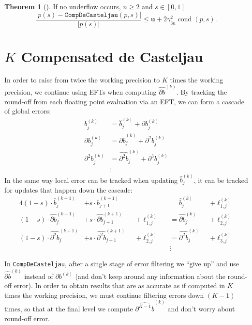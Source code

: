 \documentclass[letterpaper,10pt]{article}
\theoremstyle{definition}
\newtheorem{theorem}{Theorem}
\newcommand{\cond}[1]{\operatorname{cond}\left(#1\right)}
\newcommand{\mach}{\mathbf{u}}
\begin{document}
\begin{theorem}[\cite{Jiang2010}]
  If no underflow occurs, \(n \geq 2\) and \(s \in \left[0, 1\right]\)
  \begin{equation}
    \frac{\left|p(s) - \mathtt{CompDeCasteljau}(p, s)\right|}{\left|p(s)\right|} \leq \mach +
    2 \gamma_{3n}^2 \cond{p, s}.
  \end{equation}
\end{theorem}

\section{\texorpdfstring{\(K\)}{K} Compensated de Casteljau}\label{compensated-k}

In order to raise from twice the working precision to \(K\) times the
working precision, we continue using EFTs when computing
\(\widehat{\partial b}^{(k)}\). By tracking the round-off from each
floating point evaluation via an EFT, we can form a cascade of global errors:
\begin{align}
  b_j^{(k)} &= \widehat{b}_j^{(k)} + \partial b_j^{(k)} \\
  \partial b_j^{(k)} &= \widehat{\partial b}_j^{(k)} + \partial^2 b_j^{(k)} \\
  \partial^2 b_j^{(k)} &= \widehat{\partial^2 b}_j^{(k)} +
  \partial^3 b_j^{(k)} \\
  & \vdots \nonumber
\end{align}
In the same way local error can be tracked when updating
\(\widehat{b}_j^{(k)}\), it can be tracked for updates that happen down
the cascade:
\begin{alignat}{4}
  (1 - s) \cdot \widehat{b}_j^{(k + 1)} &+
  s \cdot \widehat{b}_{j + 1}^{(k + 1)} &&  &&=
  \widehat{b}_j^{(k)} &&+ \ell_{1, j}^{(k)} \\
  (1 - s) \cdot \widehat{\partial b}_j^{(k + 1)} &+
  s \cdot \widehat{\partial b}_{j + 1}^{(k + 1)} &&+ \ell_{1, j}^{(k)} &&=
  \widehat{\partial b}_j^{(k)} &&+ \ell_{2, j}^{(k)} \\
  (1 - s) \cdot \widehat{\partial^2 b}_j^{(k + 1)} &+
  s \cdot \widehat{\partial^2 b}_{j + 1}^{(k + 1)} &&+ \ell_{2, j}^{(k)} &&=
  \widehat{\partial^2 b}_j^{(k)} &&+ \ell_{3, j}^{(k)} \\
  &  &&  &&\vdots && \nonumber
\end{alignat}

In \texttt{CompDeCasteljau}, after a single stage of error filtering we
``give up'' and use \(\widehat{\partial b}^{(k)}\) instead of
\(\partial b^{(k)}\) (and don't keep around any information about the
round-off error). In order to obtain results that are as accurate as if
computed in \(K\) times the working precision, we must continue filtering
errors down \((K - 1)\) times, so that at the final level we compute
\(\widehat{\partial^{K - 1} b}^{(k)}\) and don't worry about round-off
error.
\end{document}
